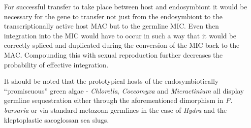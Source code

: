 For successful transfer to take place between host and endosymbiont it
would be necessary for the gene to transfer not just from the 
endosymbiont to the transcriptionally active host MAC but to the germline
MIC.  Even then integration into the MIC would have to occur in such a way
that it would be correctly spliced and duplicated during the conversion of the MIC
back to the MAC.
Compounding this with sexual reproduction further decreases the probability of
effective integration.

It should be noted that the prototypical hosts of the endosymbiotically ``promiscuous''
green algae - \textit{Chlorella}, \textit{Coccomyxa} and \textit{Micractinium} 
all display germline sequestration either through the aforementioned dimorphism
in \textit{P. bursaria} or via standard metazoan germlines in the case of
\textit{Hydra} and the kleptoplastic sacoglossan sea slugs. 

